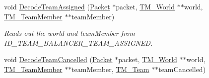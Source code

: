 \begin{DoxyCompactItemize}
void \hyperlink{class_rak_net_1_1_team_manager_aafd7ed390a40daf5e00ae14e2139bf84}{Decode\-Team\-Assigned} (\hyperlink{struct_rak_net_1_1_packet}{Packet} $\ast$packet, \hyperlink{class_rak_net_1_1_t_m___world}{T\-M\-\_\-\-World} $\ast$$\ast$world, \hyperlink{class_rak_net_1_1_t_m___team_member}{T\-M\-\_\-\-Team\-Member} $\ast$$\ast$team\-Member)
\begin{DoxyCompactList}\small\item\em Reads out the world and team\-Member from I\-D\-\_\-\-T\-E\-A\-M\-\_\-\-B\-A\-L\-A\-N\-C\-E\-R\-\_\-\-T\-E\-A\-M\-\_\-\-A\-S\-S\-I\-G\-N\-E\-D. \end{DoxyCompactList}\item 
void \hyperlink{class_rak_net_1_1_team_manager_afc6ce119bf87ca50988b7338ae6003f0}{Decode\-Team\-Cancelled} (\hyperlink{struct_rak_net_1_1_packet}{Packet} $\ast$packet, \hyperlink{class_rak_net_1_1_t_m___world}{T\-M\-\_\-\-World} $\ast$$\ast$world, \hyperlink{class_rak_net_1_1_t_m___team_member}{T\-M\-\_\-\-Team\-Member} $\ast$$\ast$team\-Member, \hyperlink{class_rak_net_1_1_t_m___team}{T\-M\-\_\-\-Team} $\ast$$\ast$team\-Cancelled)
\end{DoxyCompactItemize}
